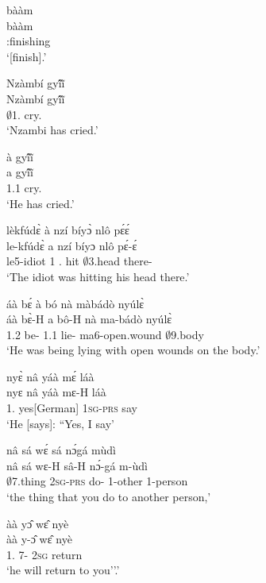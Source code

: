 \begin{exe}[(N234)]
\exN\label{n234}
  \glll bààm \\
         bààm \\
         {\IDEO}:finishing \\
    \trans `[finish].'
 
\exN\label{n235}
  \glll Nzàmbí gyĩ́ĩ̀ \\
        Nzàmbí gyĩ́ĩ̀ \\
         $\emptyset$1.{\PN} cry.{\COMPL} \\
    \trans `Nzambi has cried.'
 
\exN\label{n236}
  \glll à gyĩ́ĩ̀ \\
         a gyĩ́ĩ̀ \\
         1.{\PST}1 cry.{\COMPL} \\
    \trans `He has cried.'
 
\exN\label{n237}
  \glll lèkfúdɛ̀ à nzí bíyɔ̀ nlô pɛ́ɛ́ \\
      le-kfúdɛ̀ a nzí bíyɔ nlô pɛ́-ɛ́ \\
         le5-idiot 1 {\PROG}.{\PST}  hit $\emptyset$3.head there-{\DIST} \\
    \trans `The idiot was hitting his head there.'
 
\exN\label{n238}
  \glll áà bɛ́ à bó nà màbádò nyúlɛ̀ \\
        áà bɛ̀-H a bô-H nà ma-bádò nyúlɛ̀ \\
        1.{\PST}2 be-{\R} 1.{\PST}1 lie-{\R} {\COM} ma6-open.wound $\emptyset$9.body  \\
    \trans `He was being lying with open wounds on the body.'
 
\exN\label{n239}
  \glll nyɛ̀ nâ yáà mɛ́ láà \\
      nyɛ nâ yáà mɛ-H láà \\
        1.{\SBJ}  {\COMP} yes[German] 1\textsc{sg}-\textsc{prs} say  \\
    \trans `He [says]: ``Yes, I say'
 
\exN\label{n240}
  \glll nâ sá wɛ́ sá nɔ́gá mùdì \\
        nâ sá wɛ-H sâ-H nɔ́-gá m-ùdì \\
        {\COMP} $\emptyset$7.thing 2\textsc{sg}-\textsc{prs} do-{\R} 1-other {\N}1-person  \\
    \trans `the thing that you do to another person,'
 
\exN\label{n241}
  \glll àà yɔ̂ wɛ̂ nyè \\
         àà y-ɔ̂ wɛ̂ nyè \\
         1.{\FUT} 7-{\OBJ} 2\textsc{sg} return \\
    \trans `he will return to you''.'
 

\end{exe}

